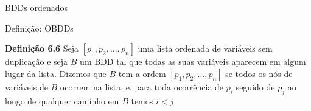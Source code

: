 \expandafter\documentclass\expandafter[table, usenames, svgnames, dvipsnames,14pt, \classopts]{beamer}
\begin{document}
\begin{frame}{BDDs ordenados}

    \begin{center}
    \end{center}

\end{frame}

\begin{frame}{Definição: OBDDs}

    \begin{block}{\textbf{Definição 6.6}}
        Seja $[p_1,p_2,...,p_n]$ uma lista ordenada de variáveis sem duplicação e seja $B$ um BDD tal que todas as suas variáveis aparecem em algum lugar da lista. Dizemos que $B$ tem a ordem $[p_1,p_2,...,p_n]$ se todos os nós de variáveis de $B$ ocorrem na lista, e, para toda ocorrência de $p_i$ seguido de $p_j$ ao longo de qualquer caminho em $B$ temos $i < j$.
    \end{block}

\end{frame}
\end{document}
